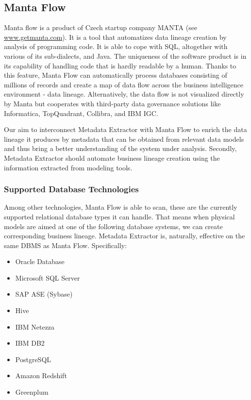 \subsection{Manta Flow}

Manta flow is a product of Czech startup company MANTA (see \url{www.getmanta.com}). It is a tool that automatizes data lineage creation by analysis of programming code. It is able to cope with SQL, altogether with various of its sub-dialects, and Java. The uniqueness of the software product is in its capability of handling code that is hardly readable by a human. Thanks to this feature, Manta Flow can automatically process databases consisting of millions of records and create a map of data flow across the business intelligence environment - data lineage.
Alternatively, the data flow is not visualized directly by Manta but cooperates with third-party data governance solutions like Informatica, TopQuadrant, Collibra, and IBM IGC.

Our aim to interconnect Metadata Extractor with Manta Flow to enrich the data lineage it produces by metadata that can be obtained from relevant data models and thus bring a better understanding of the system under analysis. 
Secondly, Metadata Extractor should automate business lineage creation using the information extracted from modeling tools.

\subsubsection{Supported Database Technologies}
Among other technologies, Manta Flow is able to scan, these are the currently supported relational database types it can handle. 
That means when physical models are aimed at one of the following database systems, we can create corresponding business lineage. Metadata Extractor is, naturally, effective on the same DBMS as Manta Flow. Specifically:
\begin{itemize}
	\item Oracle Database
	\item Microsoft SQL Server
	\item SAP ASE (Sybase)
	\item Hive
	\item IBM Netezza
	\item IBM DB2
	\item PostgreSQL
	\item Amazon Redshift
	\item Greenplum
\end{itemize}

